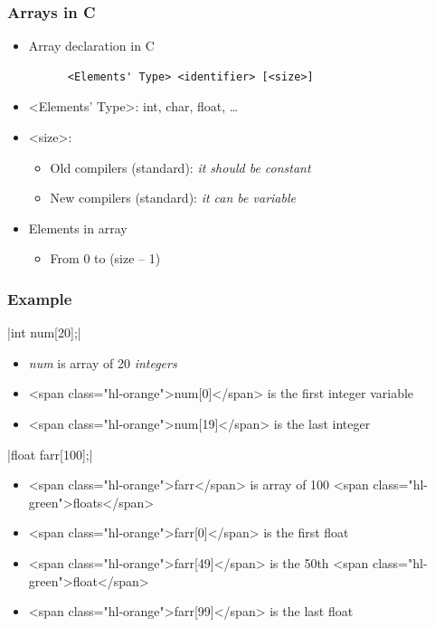 \documentclass{../c-lecture}
\begin{document}
\begin{frame}[fragile]
  \frametitle{Arrays in C}
  \begin{itemize}
    \item Array declaration in C
    \begin{verbatim}
      <Elements' Type> <identifier> [<size>]
    \end{verbatim}
    \item
      <Elements' Type>: int, char, float,
      \ldots

    \item <size>:
    \begin{itemize}
      \item
        Old compilers (standard):
        \textit{\color{RedOrange} it should be constant}
      \item
        New compilers (standard): \textit{\color{RubineRed} it can be variable}
    \end{itemize}
    \item Elements in array
    \begin{itemize}
      \item From 0 to (size – 1)
    \end{itemize}
  \end{itemize}
\end{frame}

\begin{frame}[fragile]
  \frametitle{Example}
  |int num[20];|
  \begin{itemize}
    \item
      \textit{\color{Orange} num} is array of 20
      \textit{\color{LimeGreen} integers}
    \item <span class="hl-orange">num[0]</span> is the first integer variable
    \item <span class="hl-orange">num[19]</span> is the last integer
  \end{itemize}
  |float farr[100];|
  \begin{itemize}
    \item
      <span class="hl-orange">farr</span> is array of 100
      <span class="hl-green">floats</span>
    \item <span class="hl-orange">farr[0]</span> is the first float
    \item
      <span class="hl-orange">farr[49]</span> is the 50th
      <span class="hl-green">float</span>
    \item <span class="hl-orange">farr[99]</span> is the last float
  \end{itemize}
\end{frame}
\end{document}

